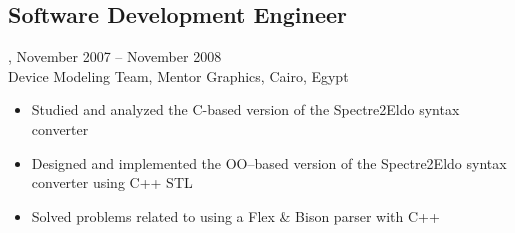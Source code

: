\subsection{Software Development Engineer}, November 2007 -- November 2008\\
Device Modeling Team, Mentor Graphics, Cairo, Egypt
\begin{itemize}
\item Studied and analyzed the C-based version of the Spectre2Eldo syntax converter
\item Designed and implemented the OO--based version of the Spectre2Eldo syntax converter using C++ STL
\item Solved problems related to using a Flex \& Bison parser with C++
\end{itemize}
